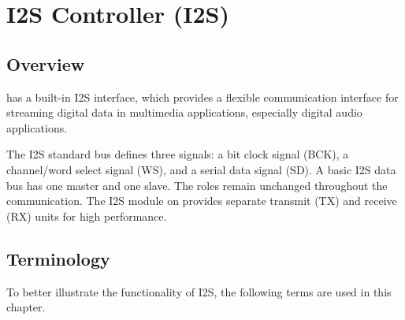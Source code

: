 \documentclass[main\_\_EN.tex]{subfiles}
\begin{document}

\ifglobal
\else
    {\let\clearpage\relax \listoftodos}
    \tableofcontents
\fi


\hypertarget{i2s}{}
\chapter{I2S Controller (I2S)}
\label{mod:i2s}

\section{Overview}
\chipname{} has a built-in I2S interface, which provides a flexible communication interface for streaming digital data in multimedia applications, especially digital audio applications.

The I2S standard bus defines three signals: a bit clock signal (BCK), a channel/word select signal (WS), and a serial data signal (SD). A basic I2S data bus has one master and one slave. The roles remain unchanged throughout the communication. The I2S module on \chipname{} provides separate transmit (TX) and receive (RX) units for high performance.

\section{Terminology}

To better illustrate the functionality of I2S, the following terms are used in this chapter. 
\end{document}

